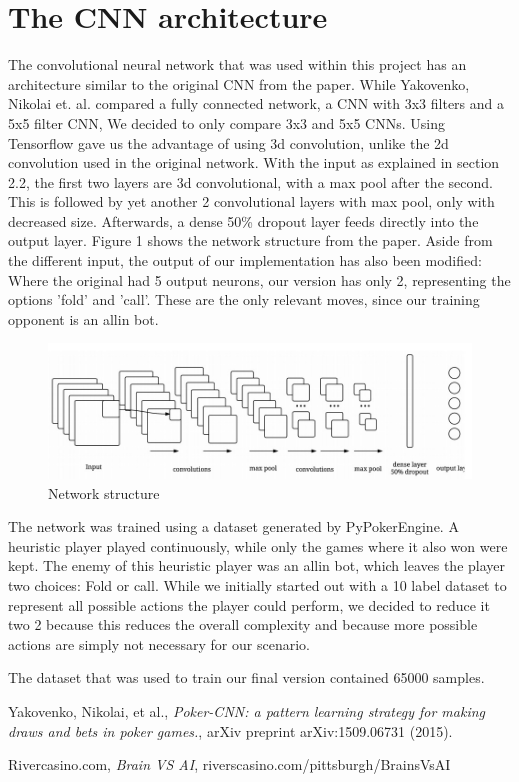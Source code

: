 \documentclass[]{report}
\begin{document}
\section{The CNN architecture \label{see:CNN_arc} }

The convolutional neural network that was used within this project has an architecture similar to the original CNN from the paper\cite{1}. While Yakovenko, Nikolai et. al. compared a fully connected network, a CNN with 3x3 filters and a 5x5 filter CNN, We decided to only compare 3x3 and 5x5 CNNs. Using Tensorflow gave us the advantage of using 3d convolution, unlike the 2d convolution used in the original network. With the input as explained in section 2.2, the first two layers are 3d convolutional, with a max pool after the second. This is followed by yet another 2 convolutional layers with max pool, only with decreased size. 
Afterwards, a dense 50\% dropout layer feeds directly into the output layer. Figure 1 shows the network structure from the paper. Aside from the different input, the output of our implementation has also been modified: Where the original had 5 output neurons, our version has only 2, representing the options 'fold' and 'call'. These are the only relevant moves, since our training opponent is an allin bot.


\begin{figure}[h]
	\caption{Network structure}
	\includegraphics[scale = 0.5]{cnn_structure.jpg}
\end{figure}

The network was trained using a dataset generated by PyPokerEngine. A heuristic player played continuously, while only the games where it also won were kept. The enemy of this heuristic player was an allin bot, which leaves the player two choices: Fold or call. While we initially started out with a 10 label dataset to represent all possible actions the player could perform, we decided to reduce it two 2 because this reduces the overall complexity and because more possible actions are simply not necessary for our scenario. 

The dataset that was used to train our final version contained 65000 samples. 

\begin{thebibliography}{}
	 Yakovenko, Nikolai, et al., \emph{Poker-CNN: a pattern learning strategy for making draws and bets in poker games.}, arXiv preprint arXiv:1509.06731 (2015).
	
 Rivercasino.com, \emph{Brain VS AI},
riverscasino.com/pittsburgh/BrainsVsAI

\end{thebibliography}  
\end{document}
